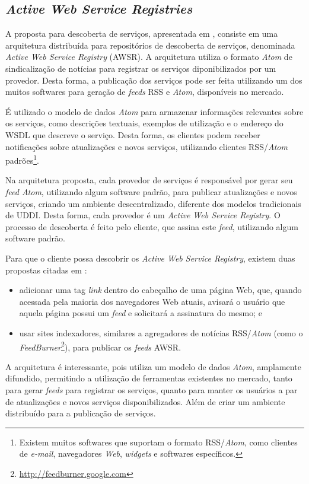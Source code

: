 \subsection{\textit{Active Web Service Registries} \cite{treiber2007active}} \label{sec:active-ws-reg}

A proposta para descoberta de serviços, apresentada em \cite{treiber2007active}, consiste em uma arquitetura distribuída para repositórios de descoberta de serviços, denominada \textit{Active Web Service Registry} (AWSR). A arquitetura utiliza o formato \textit{Atom} de sindicalização de notícias para registrar os serviços diponibilizados por um provedor. Desta forma, a publicação dos serviços pode ser feita utilizando um dos muitos softwares para geração de \textit{feeds} RSS e \textit{Atom}, disponíveis no mercado.

É utilizado o modelo de dados \textit{Atom} para armazenar informações relevantes sobre os serviços, como descrições textuais, exemplos de utilização e o endereço do WSDL que descreve o serviço. Desta forma, os clientes podem receber notificações sobre atualizações e novos serviços, utilizando clientes RSS/\textit{Atom} padrões\footnote{Existem muitos softwares que suportam o formato RSS/\textit{Atom}, como clientes de \textit{e-mail}, navegadores \textit{Web}, \textit{widgets} e softwares específicos.}.

Na arquitetura proposta, cada provedor de serviços é responsável por gerar seu \textit{feed Atom}, utilizando algum software padrão, para publicar atualizações e novos serviços, criando um ambiente descentralizado, diferente dos modelos tradicionais de UDDI. Desta forma, cada provedor é um \textit{Active Web Service Registry}. O processo de descoberta é feito pelo cliente, que assina este \textit{feed}, utilizando algum software padrão.

Para que o cliente possa descobrir os \textit{Active Web Service Registry}, existem duas propostas citadas em \cite{treiber2007active}: 
\begin{itemize}
	\item adicionar uma tag \textit{link} dentro do cabeçalho de uma página Web, que, quando acessada pela maioria dos navegadores Web atuais, avisará o usuário que aquela página possui um \textit{feed} e solicitará a assinatura do mesmo; e
  \item usar sites indexadores, similares a agregadores de notícias RSS/\textit{Atom} (como o \textit{FeedBurner}\footnote{\url{http://feedburner.google.com}}), para publicar os \textit{feeds} AWSR.
\end{itemize}

A arquitetura é interessante, pois utiliza um modelo de dados \textit{Atom}, amplamente difundido, permitindo a utilização de ferramentas existentes no mercado, tanto para gerar \textit{feeds} para registrar os serviços, quanto para manter os usuários a par de atualizações e novos serviços disponibilizados. Além de criar um ambiente distribuído para a publicação de serviços.


